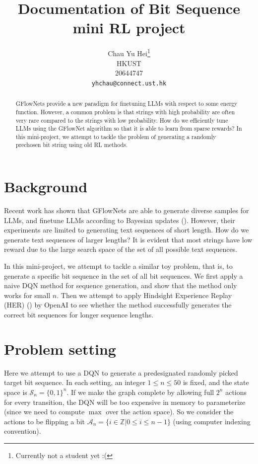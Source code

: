 \documentclass{article}
\title{Documentation of Bit Sequence mini RL project}
\author{%
  Chau Yu Hei\thanks{Currently not a student yet :(} \\
  HKUST\\
  20644747\\
  \texttt{yhchau@connect.ust.hk} \\
}
\begin{document}
\maketitle


\begin{abstract}
GFlowNets provide a new paradigm for finetuning LLMs with respect to some energy function. However, a common problem is that strings with high probability are often very rare compared to the strings with low probability. How do we efficiently tune LLMs using the GFlowNet algorithm so that it is able to learn from sparse rewards? In this mini-project, we attempt to tackle the problem of generating a randomly prechosen bit string using old RL methods.
\end{abstract}


\section{Background}
Recent work has shown that GFlowNets are able to generate diverse samples for LLMs, and finetune LLMs according to Bayesian updates (\cite{hu_llm}). However, their experiments are limited to generating text sequences of short length. How do we generate text sequences of larger lengths? It is evident that most strings have low reward due to the large search space of the set of all possible text sequences.

In this mini-project, we attempt to tackle a similar toy problem, that is, to generate a specific bit sequence in the set of all bit sequences. We first apply a naive DQN method for sequence generation, and show that the method only works for small $n$. Then we attempt to apply Hindsight Experience Replay (HER) (\cite{hindsight_openai}) by OpenAI to see whether the method successfully generates the correct bit sequences for longer sequence lengths.

\section{Problem setting}
Here we attempt to use a DQN to generate a predesignated randomly picked target bit sequence. In each setting, an integer $1 \leq n \leq 50$ is fixed, and the state space is $\mathcal{S}_n=\{0,1\}^n$. If we make the graph complete by allowing full $2^n$ actions for every transition, the DQN will be too expensive in memory to parameterize (since we need to compute $\max$ over the action space). So we consider the actions to be flipping a bit $\mathcal{A}_n=\{i \in \mathbb{Z}|0 \leq i \leq n-1\}$ (using computer indexing convention). 
\end{document}
